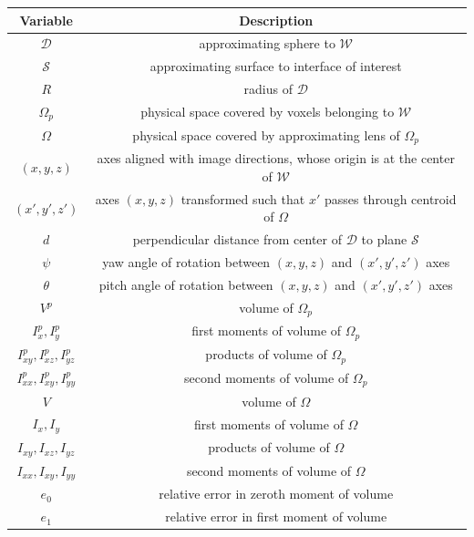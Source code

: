\begin{table}[htbp!]
 \centering
   \begin{tabular}{|c||c|}
   \hline
   {\textbf{Variable}} & {\textbf{Description}} \\ \hline \hline
   $\mathcal{D}$ & approximating sphere to $\mathcal{W}$ \\ \hline
   $\mathcal{S}$ & approximating surface to interface of interest \\ \hline      
   $R$ & radius of $\mathcal{D}$ \\ \hline   
   $\Omega_p$ & physical space covered by voxels belonging to $\mathcal{W}$ \\ \hline
   $\Omega$ & physical space covered by approximating lens of $\Omega_p$ \\ \hline      
   $(x,y,z)$ & axes aligned with image directions, whose origin is at the center of $\mathcal{W}$\\ \hline
   {$(x',y',z')$} & axes $(x,y,z)$ transformed such that $x'$ passes through centroid of $\Omega$ \\ \hline
   $d$ & perpendicular distance from center of $\mathcal{D}$ to plane $\mathcal{S}$  \\ \hline
   $\psi$ & yaw angle of rotation between $(x,y,z)$ and $(x',y',z')$ axes \\ \hline   
   $\theta$ & pitch angle of rotation between $(x,y,z)$ and $(x',y',z')$ axes \\ \hline
   $V^p$ & volume of $\Omega_p$ \\ \hline
   $I_{x}^p, I_y^p$ & first moments of volume of $\Omega_p$ \\ \hline     
   $I_{xy}^p, I_{xz}^p, I_{yz}^p$ & products of volume of $\Omega_p$ \\ \hline      
   $I_{xx}^p, I_{xy}^p, I_{yy}^p$ & second moments of volume of $\Omega_p$ \\ \hline
   $V$ & volume of $\Omega$ \\ \hline
   $I_{x}, I_y$ & first moments of volume of $\Omega$ \\ \hline
   $I_{xy}, I_{xz}, I_{yz}$ & products of volume of $\Omega$ \\ \hline   
   $I_{xx}, I_{xy}, I_{yy}$ & second moments of volume of $\Omega$ \\ \hline
   $e_0$ & relative error in zeroth moment of volume \\ \hline
   $e_1$ & relative error in first moment of volume \\ \hline

\end{tabular}
\end{table}

